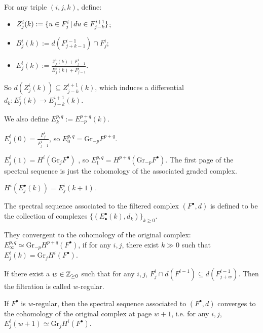 For any triple $(i,j,k)$, define:
\begin{itemize}
  \item $Z^i_j(k) := \{u \in F^i_j\,|\,du \in F^{i+1}_{j-k}\}$;
  \item $B^i_j(k) := d(F^{i-1}_{j+k-1}) \cap F^i_j$;
  \item $E^i_j(k) := \frac{Z^i_j(k) + F^i_{j-1}}{B^i_j(k) + F^i_{j-1}}$.
\end{itemize}
So $d(Z^i_j(k)) \subseteq Z^{i+1}_{j-k}(k)$, which induces a differential $d_k : E^i_j(k) \to E^{i+1}_{j-k}(k)$.

We also define $E^{p,q}_k := E_{-p}^{p+q}(k).$

\begin{examp}

  $E^i_j(0) = \frac{F^i_j}{F^i_{j-1}}$, so $E^{p,q}_0 = \mathrm{Gr}_{-p} F^{p+q}$.

  $E^i_j(1) = H^i(\mathrm{Gr}_j F^{\bullet})$ , so $E^{p,q}_1 = H^{p+q}(\mathrm{Gr}_{-p} F^{\bullet})$.
  The first page of the spectral sequence is just the cohomology of the associated graded complex.
\end{examp}


\begin{lem}
  $H^i(E^{\bullet}_{j}(k)) = E^{i}_{j}(k+1)$.
\end{lem}

\begin{defn}
  The spectral sequence associated to the filtered complex $(F^{\bullet},d)$ is defined to be the collection of complexes $\{(E^{\bullet}_{\bullet}(k),d_k)\}_{k \geq 0}$.

  They convergent to the cohomology of the original complex:
  $E^{p,q}_{\infty} \simeq \mathrm{Gr}_{-p} H^{p+q}(F^{\bullet})$, if for any $i,j$, there exist $k \gg  0$ such that $E^i_j(k) = \mathrm{Gr}_j H^i(F^{\bullet})$.

\end{defn}

\begin{defn}
  If there exist a $w \in \mathbb{Z}_{\geq 0}$ such that for any $i,j$, $F^i_j \cap d(F^{i-1}) \subseteq d(F^{i-1}_{j+w})$.
  Then the filtration is called $w$-regular.
\end{defn}

\begin{thm}
  If $F^{\bullet}$ is $w$-regular, then the spectral sequence associated to $(F^{\bullet},d)$ converges to the cohomology of the original complex at page $w+1$, i.e. for any $i,j$, $E^i_j(w+1) \simeq \mathrm{Gr}_j H^i(F^{\bullet})$.
\end{thm}


